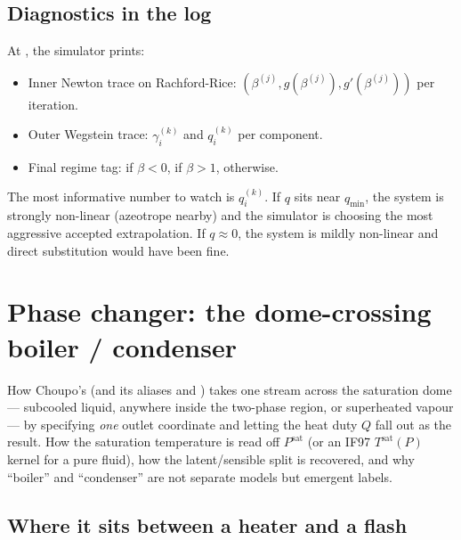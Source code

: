 \documentclass[11pt,a4paper]{article}
\newcommand{\Psat}{P^{\mathrm{sat}}}
\begin{document}
\subsection{Diagnostics in the log}

At , the simulator prints:

\begin{itemize}[leftmargin=*,nosep]
  \item Inner Newton trace on Rachford-Rice:
        $(\beta^{(j)}, g(\beta^{(j)}), g'(\beta^{(j)}))$ per iteration.
  \item Outer Wegstein trace: $\gamma_i^{(k)}$ and $q_i^{(k)}$ per component.
  \item Final regime tag:  if $\beta < 0$,
         if $\beta > 1$, 
        otherwise.
\end{itemize}

\begin{intuition}
The most informative number to watch is $q_i^{(k)}$. If $q$ sits near
$q_{\min}$, the system is strongly non-linear (azeotrope nearby) and
the simulator is choosing the most aggressive accepted extrapolation.
If $q \approx 0$, the system is mildly non-linear and direct
substitution would have been fine.
\end{intuition}

\section{Phase changer: the dome-crossing boiler / condenser}\label{ch:phase-changer}

\begin{whatyoulllearn}
How Choupo's  (and its aliases  and
) takes one stream across the saturation dome --- subcooled
liquid, anywhere inside the two-phase region, or superheated vapour --- by
specifying \emph{one} outlet coordinate and letting the heat duty $Q$ fall out
as the result.  How the saturation temperature is read off $\Psat$ (or an IF97
$T^{\mathrm{sat}}(P)$ kernel for a pure fluid), how the latent/sensible split is
recovered, and why ``boiler'' and ``condenser'' are not separate models but
emergent labels.
\end{whatyoulllearn}

\subsection{Where it sits between a heater and a flash}
\end{document}
